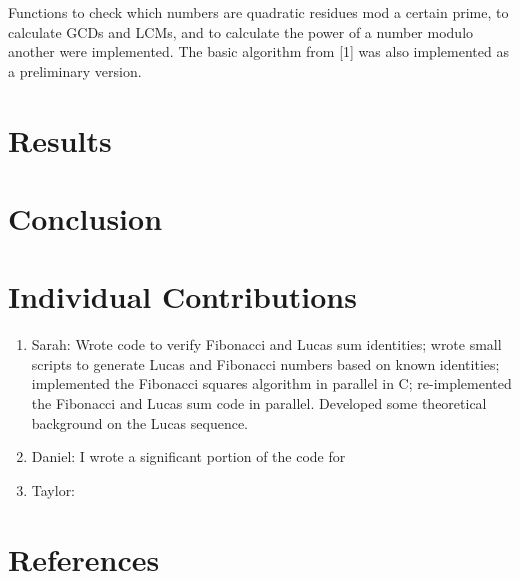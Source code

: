 \documentclass[11pt]{article}
\begin{document}
Functions to check which numbers are quadratic residues mod a certain prime, to calculate GCDs and LCMs, and to calculate the power of a number modulo another were implemented. The basic algorithm from [1] was also implemented as a preliminary version.



\section{Results}



\section{Conclusion}



\section{Individual Contributions}

\begin{enumerate}
\item Sarah: Wrote code to verify Fibonacci and Lucas sum identities; wrote small scripts to generate Lucas and Fibonacci numbers based on known identities; implemented the Fibonacci squares algorithm in parallel in C; re-implemented the Fibonacci and Lucas sum code in parallel. Developed some theoretical background on the Lucas sequence.

\item Daniel: I wrote a significant portion of the code for 

\item Taylor:
\end{enumerate}

\section{References}
\end{document}
